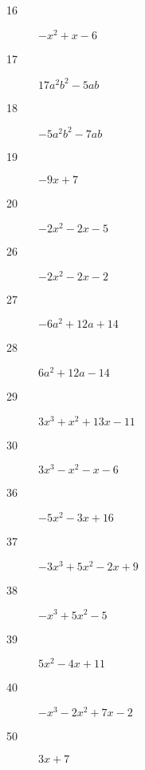 \documentclass[letterpaper, landscape]{exam}
\begin{document}
        \begin{description}






            \item[16] $-x^2 + x - 6$

            \item[17] $17a^2b^2 - 5ab$

            \item[18] $-5a^2b^2 - 7ab$

            \item[19] $-9x + 7$

            \item[20] $-2x^2 -2x - 5$

            \item[26] $-2x^2 - 2x - 2$

            \item[27] $-6a^2 + 12a + 14$

            \item[28] $6a^2 + 12a - 14$

            \item[29] $3x^3 + x^2 + 13x - 11$

            \item[30] $3x^3 - x^2 - x - 6$

            \item[36] $-5x^2 -3x + 16$

            \item[37] $-3x^3 + 5x^2 - 2x + 9$

            \item[38] $-x^3 + 5x^2 - 5$

            \item[39] $5x^2 - 4x + 11$

            \item[40] $-x^3 - 2x^2 + 7x - 2$

            \item[50] $3x + 7$


\end{description}
\end{document}
